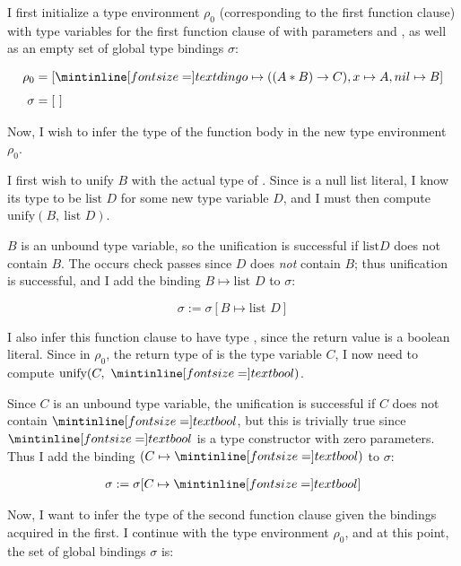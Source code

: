 \medskip

\noindent I first initialize a type environment $\rho_0$ (corresponding to the
first function clause) with type variables for the first function clause of
 with parameters  and , as well as an empty set of
global type bindings $\sigma$:

\begin{align*}
  \rho_0 &= [\ms{dingo} \mapsto ((A * B) \to C), x \mapsto A, nil \mapsto
  B]\\[4pt]
  \sigma &= [\ ]
\end{align*}

Now, I wish to infer the type of the function body in the new type environment
$\rho_0$.

\medskip

I first wish to unify $B$ with the actual type of . Since  is a
null list literal, I know its type to be $\text{list } D$ for some new type
variable $D$, and I must then compute $\text{unify}(B,\ \text{list } D)$.

\smallskip

$B$ is an unbound type variable, so the unification is successful if $\text{list
} D$ does not contain $B$. The occurs check passes since $D$ does \emph{not}
contain $B$; thus unification is successful, and I add the binding $B
\mapsto \text{list } D$ to $\sigma$:

$$
\sigma := \sigma[B \mapsto \text{list } D]
$$

I also infer this function clause to have type , since the return value
 is a boolean literal. Since in $\rho_0$, the return type of 
is the type variable $C$, I now need to compute $\text{unify}(C,\ \ms{bool})$.

\smallskip

Since $C$ is an unbound type variable, the unification is successful if $C$ does
not contain $\ms{bool}$, but this is trivially true since $\ms{bool}$ is a type
constructor with zero parameters. Thus I add the binding $(C \mapsto \ms{bool})$
to $\sigma$:

\begin{align*}
  \sigma := \sigma[C \mapsto \ms{bool}]
\end{align*}


Now, I want to infer the type of the second function clause given the bindings
acquired in the first. I continue with the type environment $\rho_0$, and at this
point, the set of global bindings $\sigma$ is:

